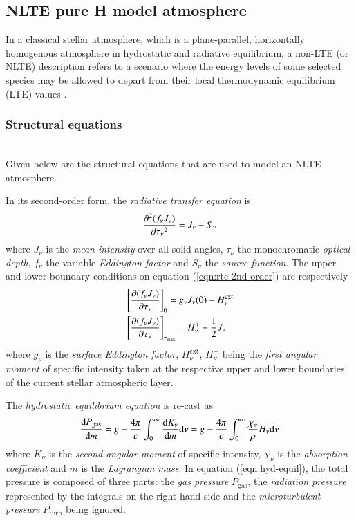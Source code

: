     \subsection{NLTE pure H model atmosphere}
    In a classical stellar atmosphere, which is a plane-parallel, horizontally homogenous atmosphere in hydrostatic and radiative equilibrium, a non-LTE (or NLTE) description refers to a scenario where the energy levels of some selected species may be allowed to depart from their local thermodynamic equilibrium (LTE) values \cite{hubeny2014theory}.
    	\subsubsection{Structural equations}
    	\quad\\	
	    Given below are the structural equations that are used to model an NLTE atmosphere.
	   
		In its second-order form, the \textit{radiative transfer equation} is
		\begin{align}
			\dfrac{\partial^{2}{(f_\nu J_\nu)}}{\partial {\tau_\nu}^{2}}=J_\nu-S_\nu \label{eqn:rte-2nd-order}
		\end{align}
		where $J_\nu$ is the \textit{mean intensity} over all solid angles, $\tau_\nu$ the monochromatic \textit{optical depth}, $f_\nu$ the variable \textit{Eddington factor} and $S_\nu$ the \textit{source function}. The upper and lower boundary conditions on equation (\ref{eqn:rte-2nd-order}) are respectively
		\begin{align}
			&\left[ \dfrac{\partial {(f_\nu J_\nu)}}{\partial {\tau_\nu}} \right]_0=g_\nu J_\nu(0)-H_\nu^\text{ext} \label{eqn:rte-upper-bc} \\
			&\left[ \dfrac{\partial {(f_\nu J_\nu)}}{\partial {\tau_\nu}} \right]_{\tau_\text{max}}=H_\nu^+-\dfrac{1}{2}J_\nu \label{eqn:rte-lower-bc}
		\end{align}
		where $g_\nu$ is the \textit{surface Eddington factor}, $H_\nu^\text{ext}$, $H_\nu^+$ being the \textit{first angular moment} of specific intensity taken at the respective upper and lower boundaries of the current stellar atmospheric layer.
		
		The \textit{hydrostatic equilibrium equation} is re-cast as
		\begin{align}
			\dfrac{\mathrm{d} {P_\text{gas}}}{\mathrm{d} {m}}=g-\dfrac{4\pi}{c}\int_{0}^{\infty}{\dfrac{\mathrm{d} {K_\nu}}{\mathrm{d} {m}}\mathrm{d} {\nu}}=g-\dfrac{4\pi}{c}\int_{0}^{\infty}{\dfrac{\chi_\nu}{\rho}H_\nu\mathrm{d} {\nu}} \label{eqn:hyd-equil}
		\end{align}
		where $K_\nu$ is the \textit{second angular moment} of specific intensity, $\chi_\nu$ is the \textit{absorption coefficient} and $m$ is the \textit{Lagrangian mass}. In equation (\ref{eqn:hyd-equil}), the total pressure is composed of three parts: the \textit{gas pressure} $P_\text{gas}$, the \textit{radiation pressure} represented by the integrals on the right-hand side and the \textit{microturbulent pressure} $P_\text{turb}$ being ignored.
		

